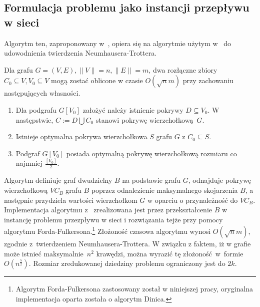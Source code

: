 \subsection{Formulacja problemu jako instancji przepływu w sieci}\label{Kernelization_network_flow}
Algorytm ten, zaproponowany w~\cite{KernelizationAlgorithms04}, opiera się na
algorytmie użytym w~\cite{Niedermeier02} do udowodnienia twierdzenia
Neumhausera-Trottera.

\begin{nt}
  Dla grafu $G=(V,E), \|V\|=n, \|E\|=m$, dwa rozłączne zbiory $C_0 \subseteq V,
  V_0 \subseteq V$ mogą zostać oblicone w czasie $O(\sqrt{n}m)$ przy zachowaniu
  następujących własności.
  \begin{enumerate}
    \item Dla podgrafu $G[V_0]$ założyć należy istnienie pokrywy $D \subseteq
      V_0$. W następstwie, $C := D \bigcup C_0$ stanowi pokrywę wierzchołkową~$G$.
    \item Istnieje optymalna pokrywa wierzchołkowa $S$ grafu $G$ z $C_0
      \subseteq S$.
    \item Podgraf $G[V_0]$ posiada optymalną pokrywę wierzchołkową rozmiaru co
      najmniej $\frac{[V_0]}{2}$. 
  \end{enumerate}
\end{nt}

Algorytm definiuje graf dwudzielny $B$ na podstawie grafu $G$, odnajduje pokrywę
wierzchołkową $VC_B$ grafu $B$ poprzez odnalezienie maksymalnego skojarzenia $B$,
a następnie przydziela wartości wierzchołkom $G$ w oparciu o przynależność do
$VC_B$.
Implementacja algorytmu z~\cite{Niedermeier02} zrealizowana jest przez
przekształcenie $B$ w instancję problemu przezpływu w sieci i rozwiązania tejże
przy pomocy algorytmu Forda-Fulkersona.\footnote{Algorytm Forda-Fulkersona
  zastosowany został w niniejszej pracy, oryginalna implementacja oparta została
o algorytm Dinica.}
Złożoność czasowa algorytmu wynosi $O(\sqrt{n}m)$, zgodnie z~twierdzeniem
Neumhausera-Trottera. 
W związku z faktem, iż w grafie może istnieć maksymalnie~$n^2$ krawędzi, można
wyrazić tę złożoność~w~formie $O(n^\frac{5}{2})$.
Rozmiar zredukowanej dziedziny problemu ograniczony jest do $2k$.

